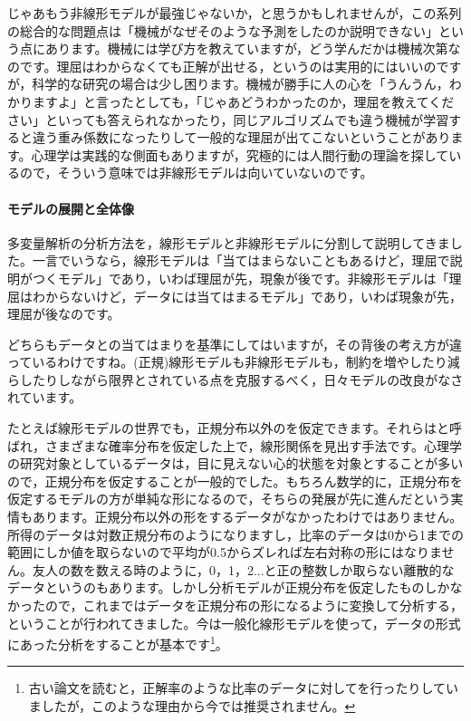 \documentclass{ltjsbook}
\begin{document}
じゃあもう非線形モデルが最強じゃないか，と思うかもしれませんが，この系列の総合的な問題点は「機械がなぜそのような予測をしたのか説明できない」という点にあります。機械には学び方を教えていますが，どう学んだかは機械次第なのです。理屈はわからなくても正解が出せる，というのは実用的にはいいのですが，科学的な研究の場合は少し困ります。機械が勝手に人の心を「うんうん，わかりますよ」と言ったとしても，「じゃあどうわかったのか，理屈を教えてください」といっても答えられなかったり，同じアルゴリズムでも違う機械が学習すると違う重み係数になったりして一般的な理屈が出てこないということがあります。心理学は実践的な側面もありますが，究極的には人間行動の理論を探しているので，そういう意味では非線形モデルは向いていないのです。

\paragraph{モデルの展開と全体像}

多変量解析の分析方法を，線形モデルと非線形モデルに分割して説明してきました。一言でいうなら，線形モデルは「当てはまらないこともあるけど，理屈で説明がつくモデル」であり，いわば理屈が先，現象が後です。非線形モデルは「理屈はわからないけど，データには当てはまるモデル」であり，いわば現象が先，理屈が後なのです。

どちらもデータとの当てはまりを基準にしてはいますが，その背後の考え方が違っているわけですね。(正規)線形モデルも非線形モデルも，制約を増やしたり減らしたりしながら限界とされている点を克服するべく，日々モデルの改良がなされています。

たとえば線形モデルの世界でも，正規分布以外のを仮定できます。それらはと呼ばれ，さまざまな確率分布を仮定した上で，線形関係を見出す手法です。心理学の研究対象としているデータは，目に見えない心的状態を対象とすることが多いので，正規分布を仮定することが一般的でした。もちろん数学的に，正規分布を仮定するモデルの方が単純な形になるので，そちらの発展が先に進んだという実情もあります。正規分布以外の形をするデータがなかったわけではありません。所得のデータは対数正規分布のようになりますし，比率のデータは0から1までの範囲にしか値を取らないので平均が0.5からズレれば左右対称の形にはなりません。友人の数を数える時のように，0，1，2...と正の整数しか取らない離散的なデータというのもあります。しかし分析モデルが正規分布を仮定したものしかなかったので，これまではデータを正規分布の形になるように変換して分析する，ということが行われてきました。今は一般化線形モデルを使って，データの形式にあった分析をすることが基本です\footnote{古い論文を読むと，正解率のような比率のデータに対してを行ったりしていましたが，このような理由から今では推奨されません。}。
\end{document}
